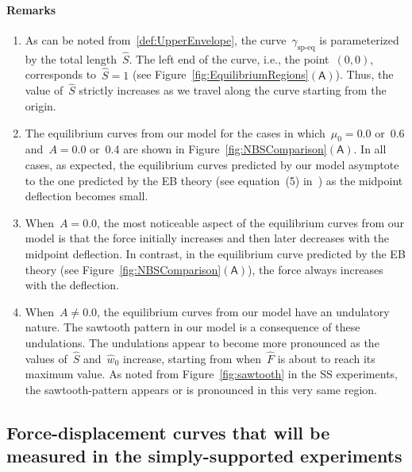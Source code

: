 \documentclass[preprint,10pt,times]{elsarticle}
\numberwithin{equation}{section}
\newcommand{\pr}[1]{\left( #1 \right)}
\newcommand{\subf}[1]{\pr{\textsf{#1}}}
\begin{document}
\paragraph{Remarks}
\begin{enumerate}
\item \label{enu:Remark1}As can be noted from~\eqref{def:UpperEnvelope},
the curve~$\gamma_{\text{sp-eq}}$ is parameterized by the total
length~$\hat{S}$. The left end of the curve, i.e., the point~$(0,0)$,
corresponds to~$\hat{S}=1$ (see Figure~\ref{fig:EquilibriumRegions}$\subf{A}$).
Thus, the value of~$\hat{S}$ strictly increases as we travel along
the curve starting from the origin.
\item The equilibrium curves from our model for the cases in which~$\mu_0=0.0$
or~0.6 and~$A=0.0$ or~0.4 are shown in Figure~\ref{fig:NBSComparison}$\subf{A}$.
In all cases, as expected, the equilibrium curves predicted by our
model asymptote to the one predicted by the EB theory (see equation~(5) in~\cite{Sayaka2021Sawtooth}) as the midpoint
deflection becomes small.
\item When~$A=0.0$, the most noticeable aspect of the equilibrium curves
from our model is that the force initially increases and then later
decreases with the midpoint deflection. In contrast, in the equilibrium
curve predicted by the EB theory (see Figure~\ref{fig:NBSComparison}$\subf{A}$),
the force always increases with the deflection.
\item When~$A\neq0.0$, the equilibrium curves from our model have an undulatory
nature. The sawtooth pattern in our model is a consequence of these
undulations. The undulations appear to become more pronounced as the
values of~$\hat{S}$ and~$\hat{w}_0$ increase, starting from when~$\hat{F}$
is about to reach its maximum value. As noted from Figure~\ref{fig:sawtooth}
in the SS experiments, the sawtooth-pattern appears or is pronounced
in this very same region.
\end{enumerate}

\subsection{Force-displacement curves that will be measured in the simply-supported
experiments\label{subsec:Force-displacement-curves-that}}
\end{document}
